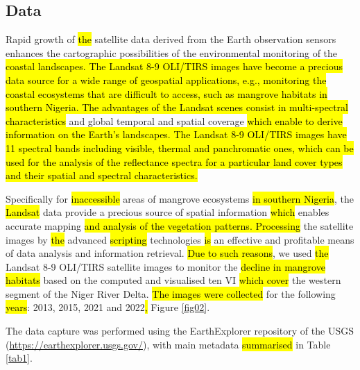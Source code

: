 \documentclass[jmse,article,submit,pdftex,moreauthors]{Definitions/mdpi}
\begin{document}
\subsection{Data}
Rapid growth of \hl{the }satellite data derived from the Earth observation sensors\hl{ }enhances the cartographic possibilities of the environmental monitoring of the \hl{coastal landscapes. The Landsat 8-9 OLI/TIRS images have become a precious data source for a wide range of geospatial applications, e.g., monitoring the coastal ecosystems that are difficult to access, such as mangrove habitats in southern Nigeria. The advantages of the Landsat scenes consist in multi-spectral characteristics }and\hl{ }global temporal and spatial coverage\hl{ which enable to derive information on the Earth's landscapes. The Landsat 8-9 OLI/TIRS images have 11 spectral bands including visible, thermal and panchromatic ones, which can be used for the analysis of the reflectance spectra for a particular land cover types and their spatial and spectral characteristics. }

Specifically for \hl{inaccessible }areas of mangrove ecosystems \hl{in southern Nigeria}, the \hl{Landsat} data provide a precious source of spatial information \hl{which} enables accurate mapping \hl{and analysis of the vegetation patterns. Processing }the satellite images by \hl{the }advanced \hl{scripting }technologies \hl{is }an effective and profitable means of data analysis and information retrieval. \hl{Due to such reasons}, we used \hl{the} Landsat 8-9 OLI/TIRS satellite images to monitor the\hl{ decline in mangrove habitats} based on the computed and visualised ten VI \hl{which cover} the western segment of the Niger River Delta. \hl{The images were collected} for the following \hl{years}: 2013, 2015, 2021 and 2022\hl{, }Figure \ref{fig02}. 

The data capture was performed using the EarthExplorer repository of the USGS (\href{https://earthexplorer.usgs.gov/}{https://earthexplorer.usgs.gov/}), with main\hl{ }metadata \hl{summarised} in Table \ref{tab1}. 
\end{document}
